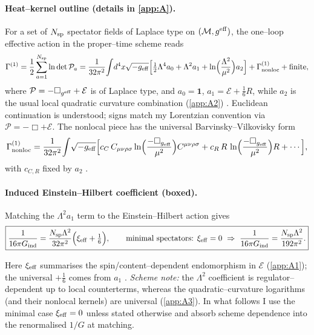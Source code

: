 \documentclass{iopjournal}
\begin{document}
\paragraph{Heat–kernel outline (details in \cref{app:A}).}
For a set of $N_{\rm sp}$ spectator fields of Laplace type on $(\mathcal M,g^{\rm eff})$, the one–loop effective action in the proper–time scheme reads
\begin{equation}
\Gamma^{(1)}=\frac{1}{2}\sum_{a=1}^{N_{\rm sp}}\ln\det\mathcal P_a
=\frac{1}{32\pi^2}\!\int\! d^4x\sqrt{-g_{\rm eff}}\Big[\tfrac12\Lambda^4 a_0+\Lambda^2 a_1+\ln\!\Big(\frac{\Lambda^2}{\mu^2}\Big)a_2\Big]
+\Gamma^{(1)}_{\rm nonloc}+{\rm finite},
\label{eq:sec3_Gamma_loc}
\end{equation}
where $\mathcal P=-\Box_{g^{\rm eff}}+\mathcal E$ is of Laplace type, and $a_0=\mathbf{1}$, $a_1=\mathcal E+\tfrac16 R$, while $a_2$ is the usual local quadratic curvature combination (\cref{app:A2}) \cite{DeWitt1965,BirrellDavies,ParkerToms,Vassilevich2003}. Euclidean continuation is understood; signs match my Lorentzian convention via $\mathcal P=-\Box+\mathcal E$. The nonlocal piece has the universal Barvinsky–Vilkovisky form
\begin{equation}
\Gamma^{(1)}_{\rm nonloc}
=\frac{1}{32\pi^2}\!\int\! \sqrt{-g_{\rm eff}}\Big[
c_C\,C_{\mu\nu\rho\sigma}\ln\!\Big(\frac{-\Box_{g_{\rm eff}}}{\mu^2}\Big)C^{\mu\nu\rho\sigma}
+c_R\,R\,\ln\!\Big(\frac{-\Box_{g_{\rm eff}}}{\mu^2}\Big)R+\cdots\Big],
\label{eq:sec3_nonloc}
\end{equation}
with $c_{C,R}$ fixed by $a_2$ \cite{BarvinskyVilkovisky,BarvinskyVilkovisky1990,Donoghue1994}.

\paragraph{Induced Einstein–Hilbert coefficient (boxed).}
Matching the $\Lambda^2 a_1$ term to the Einstein–Hilbert action gives
\begin{equation}
\boxed{\frac{1}{16\pi G_{\rm ind}}=\frac{N_{\rm sp}\Lambda^2}{32\pi^2}\Big(\xi_{\rm eff}+\tfrac16\Big),
\qquad
\text{minimal spectators: }\xi_{\rm eff}=0\ \Rightarrow\ \frac{1}{16\pi G_{\rm ind}}=\frac{N_{\rm sp}\Lambda^2}{192\pi^2}.}
\label{eq:sec3_Gind_box}
\end{equation}

Here $\xi_{\rm eff}$ summarises the spin/content–dependent endomorphism in $\mathcal E$ (\cref{app:A1}); the universal $+\tfrac16$ comes from $a_1$ \cite{ParkerToms,Vassilevich2003}. \emph{Scheme note:} the $\Lambda^2$ coefficient is regulator–dependent up to local counterterms, whereas the quadratic–curvature logarithms (and their nonlocal kernels) are universal (\cref{app:A3}). In what follows I use the minimal case $\xi_{\rm eff}=0$ unless stated otherwise and absorb scheme dependence into the renormalised $1/G$ at matching.
\end{document}
